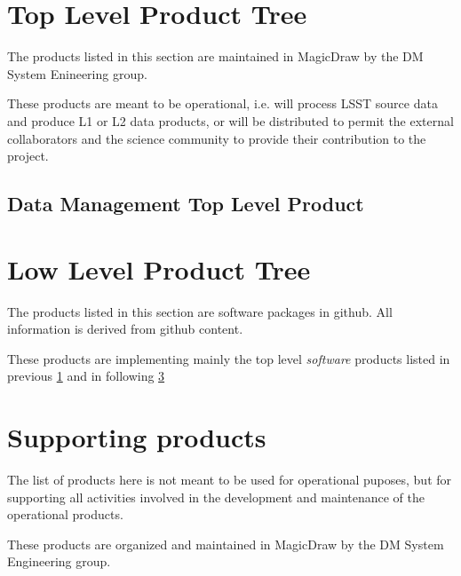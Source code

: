 \section{Top Level Product Tree}\label{sect:top}

The products listed in this section are maintained in MagicDraw by the DM System Enineering group. 

These products are meant to be operational, i.e. will process LSST source data and produce L1 or L2 data products, or will be distributed to permit the external collaborators and the science community to provide their contribution to the project.

\subsection{Data Management Top Level Product}\label{sec:dmtop}



\newpage
\section{Low Level Product Tree}\label{sect:low}

The products listed in this section are software packages in github.
All information is derived from github content.

These products are implementing mainly the top level \textit{software} products listed in previous \ref{sect:top} and in following \ref{sect:sups}



\section{Supporting products}\label{sect:sups}

The list of products here is not meant to be used for operational puposes, but for supporting all activities involved in the development and maintenance of the operational products. 

These products are organized and maintained in MagicDraw by the DM System Engineering group.


